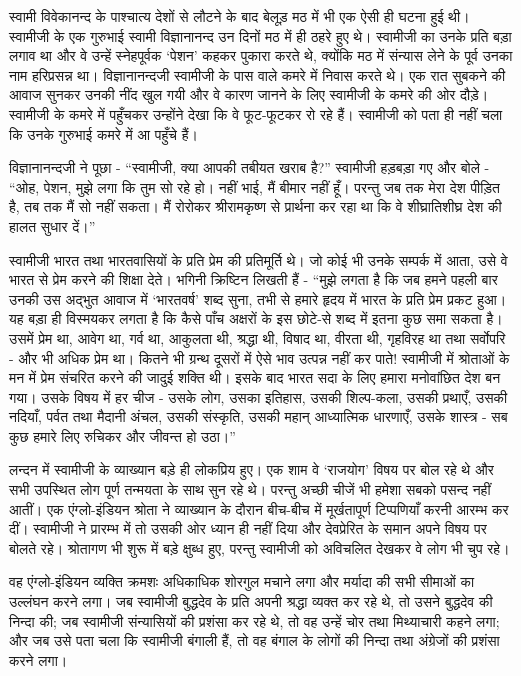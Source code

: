 स्वामी विवेकानन्द के पाश्चात्य देशों से लौटने के बाद बेलूड़ मठ में भी एक ऐसी ही घटना हुई थी। स्वामीजी के एक गुरुभाई स्वामी विज्ञानानन्द उन दिनों मठ में ही ठहरे हुए थे। स्वामीजी का उनके प्रति बड़ा लगाव था और वे उन्हें स्नेहपूर्वक ‘पेशन’ कहकर पुकारा करते थे, क्योंकि मठ में संन्यास लेने के पूर्व उनका नाम हरिप्रसन्न था। विज्ञानानन्दजी स्वामीजी के पास वाले कमरे में निवास करते थे। एक रात सुबकने की आवाज सुनकर उनकी नींद खुल गयी और वे कारण जानने के लिए स्वामीजी के कमरे की ओर दौड़े। स्वामीजी के कमरे में पहुँचकर उन्होंने देखा कि वे फूट-फूटकर रो रहे हैं। स्वामीजी को पता ही नहीं चला कि उनके गुरुभाई कमरे में आ पहुँचे हैं। 

विज्ञानानन्दजी ने पूछा - “स्वामीजी, क्या आपकी तबीयत खराब है?” स्वामीजी हड़बड़ा गए और बोले - “ओह, पेशन, मुझे लगा कि तुम सो रहे हो। नहीं भाई, मैं बीमार नहीं हूँ। परन्तु जब तक मेरा देश पीड़ित है, तब तक मैं सो नहीं सकता। मैं रोरोकर श्रीरामकृष्ण से प्रार्थना कर रहा था कि वे शीघ्रातिशीघ्र देश की हालत सुधार दें।” 

स्वामीजी भारत तथा भारतवासियों के प्रति प्रेम की प्रतिमूर्ति थे। जो कोई भी उनके सम्पर्क में आता, उसे वे भारत से प्रेम करने की शिक्षा देते। भगिनी क्रिष्टिन लिखती हैं - “मुझे लगता है कि जब हमने पहली बार उनकी उस अद्भुत आवाज में ‘भारतवर्ष’ शब्द सुना, तभी से हमारे हृदय में भारत के प्रति प्रेम प्रकट हुआ। यह बड़ा ही विस्मयकर लगता है कि कैसे पाँच अक्षरों के इस छोटे-से शब्द में इतना कुछ समा सकता है। उसमें प्रेम था, आवेग था, गर्व था, आकुलता थी, श्रद्धा थी, विषाद था, वीरता थी, गृहविरह था तथा सर्वोपरि - और भी अधिक प्रेम था। कितने भी ग्रन्थ दूसरों में ऐसे भाव उत्पन्न नहीं कर पाते! स्वामीजी में श्रोताओं के मन में प्रेम संचरित करने की जादुई शक्ति थी। इसके बाद भारत सदा के लिए हमारा मनोवांछित देश बन गया। उसके विषय में हर चीज - उसके लोग, उसका इतिहास, उसकी शिल्प-कला, उसकी प्रथाएँ, उसकी नदियाँ, पर्वत तथा मैदानी अंचल, उसकी संस्कृति, उसकी महान् आध्यात्मिक धारणाएँ, उसके शास्त्र - सब कुछ हमारे लिए रुचिकर और जीवन्त हो उठा।” 

\vskip -8pt

\delimiter

लन्दन में स्वामीजी के व्याख्यान बड़े ही लोकप्रिय हुए। एक शाम वे ‘राजयोग’ विषय पर बोल रहे थे और सभी उपस्थित लोग पूर्ण तन्मयता के साथ सुन रहे थे। परन्तु अच्छी चीजें भी हमेशा सबको पसन्द नहीं आतीं। एक एंग्लो-इंडियन श्रोता ने व्याख्यान के दौरान बीच-बीच में मूर्खतापूर्ण टिप्पणियाँ करनी आरम्भ कर दीं। स्वामीजी ने प्रारम्भ में तो उसकी ओर ध्यान ही नहीं दिया और देवप्रेरित के समान अपने विषय पर बोलते रहे। श्रोतागण भी शुरू में बड़े क्षुब्ध हुए, परन्तु स्वामीजी को अविचलित देखकर वे लोग भी चुप रहे। 

वह एंग्लो-इंडियन व्यक्ति क्रमशः अधिकाधिक शोरगुल मचाने लगा और मर्यादा की सभी सीमाओं का उल्लंघन करने लगा। जब स्वामीजी बुद्धदेव के प्रति अपनी श्रद्धा व्यक्त कर रहे थे, तो उसने बुद्धदेव की निन्दा की; जब स्वामीजी संन्यासियों की प्रशंसा कर रहे थे, तो वह उन्हें चोर तथा मिथ्याचारी कहने लगा; और जब उसे पता चला कि स्वामीजी बंगाली हैं, तो वह बंगाल के लोगों की निन्दा तथा अंग्रेजों की प्रशंसा करने लगा। 

